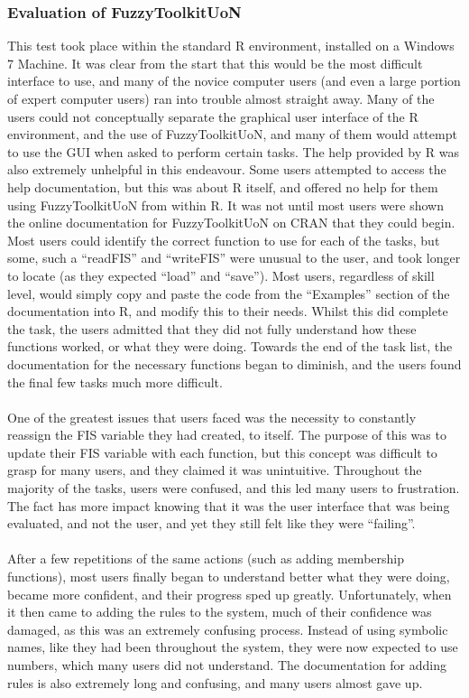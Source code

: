 \subsubsection{Evaluation of FuzzyToolkitUoN}
This test took place within the standard R environment, installed on a Windows 7 Machine. It was clear from the start that this would be the most difficult interface to use, and many of the novice computer users (and even a large portion of expert computer users) ran into trouble almost straight away. Many of the users could not conceptually separate the graphical user interface of the R environment, and the use of FuzzyToolkitUoN, and many of them would attempt to use the GUI when asked to perform certain tasks. The help provided by R was also extremely unhelpful in this endeavour. Some users attempted to access the help documentation, but this was about R itself, and offered no help for them using FuzzyToolkitUoN from within R. It was not until most users were shown the online documentation for FuzzyToolkitUoN on CRAN that they could begin. Most users could identify the correct function to use for each of the tasks, but some, such a ``readFIS'' and ``writeFIS'' were unusual to the user, and took longer to locate (as they expected ``load'' and ``save''). Most users, regardless of skill level, would simply copy and paste the code from the ``Examples'' section of the documentation into R, and modify this to their needs. Whilst this did complete the task, the users admitted that they did not fully understand how these functions worked, or what they were doing. Towards the end of the task list, the documentation for the necessary functions began to diminish, and the users found the final few tasks much more difficult.\ \\
\ \\
One of the greatest issues that users faced was the necessity to constantly reassign the FIS variable they had created, to itself. The purpose of this was to update their FIS variable with each function, but this concept was difficult to grasp for many users, and they claimed it was unintuitive. Throughout the majority of the tasks, users were confused, and this led many users to frustration. The fact has more impact knowing that it was the user interface that was being evaluated, and not the user, and yet they still felt like they were ``failing''.\ \\
\ \\
After a few repetitions of the same actions (such as adding membership functions), most users finally began to understand better what they were doing, became more confident, and their progress sped up greatly. Unfortunately, when it then came to adding the rules to the system, much of their confidence was damaged, as this was an extremely confusing process. Instead of using symbolic names, like they had been throughout the system, they were now expected to use numbers, which many users did not understand. The documentation for adding rules is also extremely long and confusing, and many users almost gave up.\ \\
